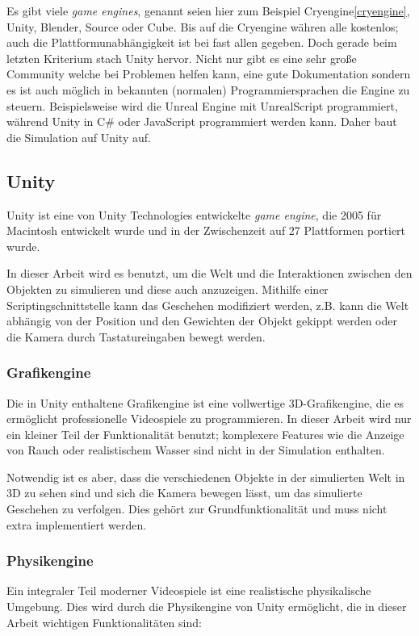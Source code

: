 Es gibt viele \textit{game engines}, genannt seien hier zum Beispiel Cryengine\ref{cryengine}, Unity, Blender, Source
oder Cube. Bis auf die Cryengine w{\"{a}}hren alle kostenlos; auch die Plattformunabh{\"{a}}ngigkeit ist bei
fast allen gegeben. Doch gerade beim letzten Kriterium stach Unity hervor. Nicht nur gibt es eine sehr gro{\ss}e
Community welche bei Problemen helfen kann, eine gute Dokumentation sondern es ist auch m{\"{o}}glich in bekannten
(normalen) Programmiersprachen die Engine zu steuern. Beispielsweise wird die Unreal Engine mit UnrealScript
programmiert, w{\"{a}}hrend Unity in C\# oder JavaScript programmiert werden kann. Daher baut die Simulation auf
Unity auf.

\subsection{Unity}\label{unity}
Unity ist eine von Unity Technologies entwickelte \textit{game engine}, die 2005 f{\"{u}}r Macintosh entwickelt wurde und in der Zwischenzeit auf 27 Plattformen portiert wurde.

In dieser Arbeit wird es benutzt, um die Welt und die Interaktionen zwischen den Objekten zu simulieren und diese auch anzuzeigen. Mithilfe einer Scriptingschnittstelle kann das Geschehen modifiziert werden, z.B. kann die Welt
abh{\"{a}}ngig von der Position und den Gewichten der Objekt gekippt werden oder die Kamera durch Tastatureingaben bewegt werden.

\subsubsection{Grafikengine}
Die in Unity enthaltene Grafikengine ist eine vollwertige 3D-Grafikengine, die es erm{\"{o}}glicht professionelle Videospiele zu programmieren. In dieser Arbeit wird nur
ein kleiner Teil der Funktionalit{\"{a}}t benutzt; komplexere Features wie die Anzeige von Rauch oder realistischem Wasser sind nicht in der Simulation enthalten.

Notwendig ist es aber, dass die verschiedenen Objekte in der simulierten Welt in 3D zu sehen sind und sich die Kamera bewegen l{\"{a}}sst, um das simulierte Geschehen zu
verfolgen. Dies geh{\"{o}}rt zur Grundfunktionalit{\"{a}}t und muss nicht extra implementiert werden.

\subsubsection{Physikengine}
Ein integraler Teil moderner Videospiele ist eine realistische physikalische Umgebung. Dies wird durch die Physikengine von Unity erm{\"{o}}glicht, die in dieser Arbeit wichtigen Funktionalit{\"{a}}ten sind:

